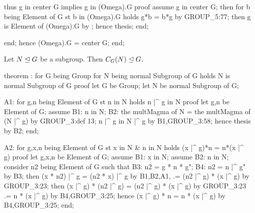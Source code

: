     thus g in center G implies g in  (Omega).G
    proof
      assume g in center G;
      then for b being Element of G st b in (Omega).G holds g*b = b*g
      by GROUP_5:77;
      then g is Element of  (Omega).G by ;
      hence thesis;
    end;

  end;
  hence  (Omega).G = center G;
end;
\eatline
{}\nwendcode{}\nwdocspar
\begin{theorem}
Let $N\trianglelefteq G$ be a subgroup. Then $C_{G}(N)\trianglelefteq G$.
\end{theorem}

\nwenddocs{}\endmoddef\nwstartdeflinemarkup{}\nwenddeflinemarkup
theorem :
  for G being Group
  for N being normal Subgroup of G
  holds  N is normal Subgroup of G
proof
  let G be Group;
  let N be normal Subgroup of G;

  A1: for g,n being Element of G st n in N holds n |^ g in N
  proof
    let g,n be Element of G;
    assume B1: n in N;
    B2: the multMagma of N = the multMagma of (N |^ g) by GROUP_3:def 13;
    n |^ g in N |^ g by B1,GROUP_3:58;
    hence thesis by B2;
  end;

  A2: for g,x,n being Element of G st x in  N & n in N
  holds (x |^ g)*n = n*(x |^ g)
  proof
    let g,x,n be Element of G;
    assume B1: x in  N;
    assume B2: n in N;
    consider n2 being Element of G such that
    B3: n2 = g * n * g";
    B4: n2 = n |^ g" by B3;
    then (x * n2) |^ g = (n2 * x) |^ g by B1,B2,A1,
                      .= (n2 |^ g) * (x |^ g) by GROUP_3:23;
    then (x |^ g) * (n2 |^ g) = (n2 |^ g) * (x |^ g) by GROUP_3:23
                             .= n * (x |^ g) by B4,GROUP_3:25;
    hence (x |^ g) * n = n * (x |^ g) by B4,GROUP_3:25;
  end;

